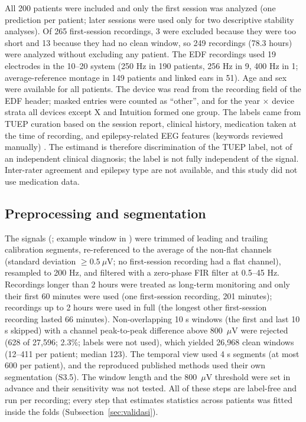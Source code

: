 All 200 patients were included and only the first session was analyzed (one prediction per patient; later sessions were used only for two descriptive stability analyses).
Of 265 first-session recordings, 3 were excluded because they were too short and 13 because they had no clean window, so 249 recordings (78.3 hours) were analyzed without excluding any patient.
The EDF recordings used 19 electrodes in the 10--20 system (250 Hz in 190 patients, 256 Hz in 9, 400 Hz in 1; average-reference montage in 149 patients and linked ears in 51). Age and sex were available for all patients. The device was read from the recording field of the EDF header; masked entries were counted as ``other'', and for the year $\times$ device strata all devices except X and Intuition formed one group.
The labels came from TUEP curation based on the session report, clinical history, medication taken at the time of recording, and epilepsy-related EEG features (keywords reviewed manually) \cite{veloso2017}. The estimand is therefore discrimination of the TUEP label, not of an independent clinical diagnosis; the label is not fully independent of the signal. Inter-rater agreement and epilepsy type are not available, and this study did not use medication data.

\subsection{Preprocessing and segmentation}\label{sec:praproses}

The signals (; example window in ) were trimmed of leading and trailing calibration segments, re-referenced to the average of the non-flat channels (standard deviation $\geq 0.5~\mu$V; no first-session recording had a flat channel), resampled to 200 Hz, and filtered with a zero-phase FIR filter at 0.5--45 Hz.
Recordings longer than 2 hours were treated as long-term monitoring and only their first 60 minutes were used (one first-session recording, 201 minutes); recordings up to 2 hours were used in full (the longest other first-session recording lasted 66 minutes).
Non-overlapping 10 s windows (the first and last 10 s skipped) with a channel peak-to-peak difference above 800~$\mu$V were rejected (628 of 27,596; 2.3\%; labels were not used), which yielded 26,968 clean windows (12--411 per patient; median 123). The temporal view used 4 s segments (at most 600 per patient), and the reproduced published methods used their own segmentation (S3.5).
The window length and the 800~$\mu$V threshold were set in advance and their sensitivity was not tested. All of these steps are label-free and run per recording; every step that estimates statistics across patients was fitted inside the folds (Subsection~\ref{sec:validasi}).

